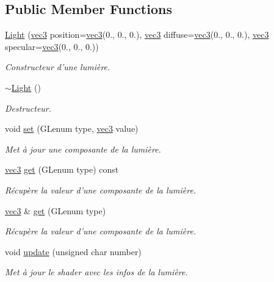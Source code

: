 \subsection*{Public Member Functions}
\begin{DoxyCompactItemize}
\item 
\hyperlink{class_light_aa7bcc37dee068f7266f86e07a3dfe4f0}{Light} (\hyperlink{structvec3}{vec3} position=\hyperlink{structvec3}{vec3}(0., 0., 0.), \hyperlink{structvec3}{vec3} diffuse=\hyperlink{structvec3}{vec3}(0., 0., 0.), \hyperlink{structvec3}{vec3} specular=\hyperlink{structvec3}{vec3}(0., 0., 0.))
\begin{DoxyCompactList}\small\item\em Constructeur d'une lumière. \end{DoxyCompactList}\item 
\hyperlink{class_light_ad0e59fad13bb6cfadc25b2c477e9ddc7}{$\sim$\+Light} ()
\begin{DoxyCompactList}\small\item\em Destructeur. \end{DoxyCompactList}\item 
void \hyperlink{class_light_a9fcc4b3ffdeedbe214ee8384c7d311b9}{set} (G\+Lenum type, \hyperlink{structvec3}{vec3} value)
\begin{DoxyCompactList}\small\item\em Met à jour une composante de la lumière. \end{DoxyCompactList}\item 
\hyperlink{structvec3}{vec3} \hyperlink{class_light_ad0f5f939bc047e39c6deb2e264a5a2c1}{get} (G\+Lenum type) const 
\begin{DoxyCompactList}\small\item\em Récupère la valeur d'une composante de la lumière. \end{DoxyCompactList}\item 
\hyperlink{structvec3}{vec3} \& \hyperlink{class_light_a74a0381255c1c7e002ac583401a46de0}{get} (G\+Lenum type)
\begin{DoxyCompactList}\small\item\em Récupère la valeur d'une composante de la lumière. \end{DoxyCompactList}\item 
void \hyperlink{class_light_ade4c742c8ca2c014d74c659fa615ffd7}{update} (unsigned char number)
\begin{DoxyCompactList}\small\item\em Met à jour le shader avec les infos de la lumière. \end{DoxyCompactList}\end{DoxyCompactItemize}
